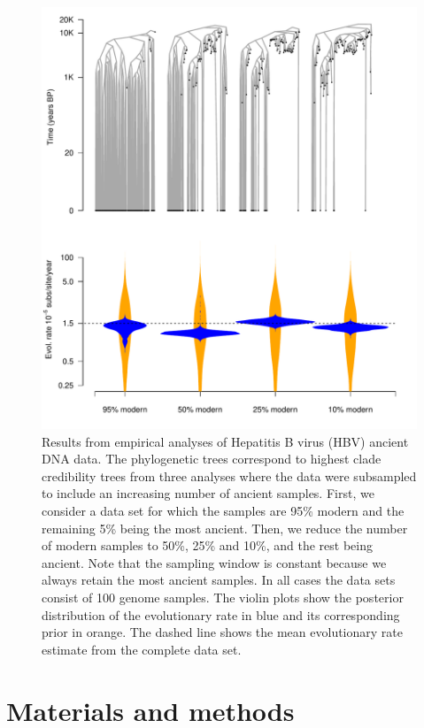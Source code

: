 \documentclass[11pt]{article}
\begin{document}
\begin{figure}[H]
    \begin{center}
        \includegraphics[scale=0.7, angle=0]{empirical_results_biased.pdf}
        \caption{Results from empirical analyses of Hepatitis B virus (HBV) ancient DNA data. The phylogenetic trees correspond to highest clade credibility trees from three analyses where the data were subsampled to include an increasing number of ancient samples. First, we consider a data set for which the samples are 95\% modern and the remaining 5\% being the most ancient. Then, we reduce the number of modern samples to 50\%, 25\% and 10\%, and the rest being ancient. Note that the sampling window is constant because we always retain the most ancient samples. In all cases the data sets consist of 100 genome samples. The violin plots show the posterior distribution of the evolutionary rate in blue and its corresponding prior in orange. The dashed line shows the mean evolutionary rate estimate from the complete data set.}
        \label{figure:Fig7}
    \end{center}
\end{figure}

\section{Materials and methods}
\end{document}

